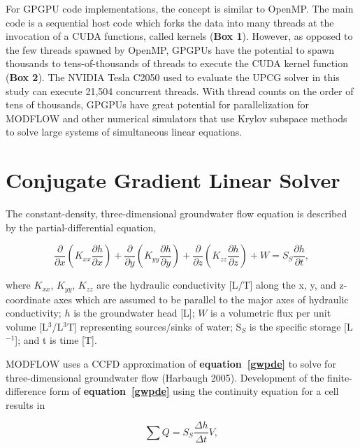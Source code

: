 \documentclass[12pt]{article}
\begin{document}
For GPGPU code implementations, the concept is similar to OpenMP.  The main code is a sequential host code which forks the data into many threads at the invocation of a CUDA \color{blue}functions, called kernels (\textbf{Box 1})\color{black}.  \color{blue}However, as opposed to the few threads spawned by OpenMP, GPGPUs have the potential to spawn thousands to tens-of-thousands of threads to execute the CUDA kernel function (\textbf{Box 2}). The NVIDIA Tesla C2050 used to evaluate the UPCG solver in this study can execute 21,504 concurrent threads. \color{black} With thread counts on the order of tens of thousands, GPGPUs have great potential for parallelization \color{blue} for MODFLOW and other numerical simulators that use Krylov subspace methods to solve large systems of simultaneous linear equations\color{black}.


\section* {\bf Conjugate Gradient Linear Solver}
The constant-density, three-dimensional groundwater flow equation is described by the partial-differential equation,

\begin{equation}
	\label{gwpde}
	\frac{\partial}{\partial x} \left( K_{xx} \frac{\partial h}{\partial x} \right) + 
	\frac{\partial}{\partial y} \left( K_{yy} \frac{\partial h}{\partial y} \right) + 
	\frac{\partial}{\partial z} \left( K_{zz} \frac{\partial h}{\partial z} \right) + 
	W = S_{S} \frac{\partial h}{\partial t} ,
\end{equation}

\noindent
where  $K_{xx}$, $K_{yy}$, $K_{zz}$ are the hydraulic conductivity [L/T] along the x, y, and z-coordinate axes which are assumed to be parallel to the major axes of hydraulic conductivity; $h$ is the groundwater head [L]; $W$ is a volumetric flux per unit volume [L$^{3}$/L$^{3}$T] representing sources/sinks of water; S$_{S}$ is the specific storage [L$^{-1}$]; and t is time [T].

MODFLOW uses a CCFD approximation of \textbf{equation~\ref{gwpde}} to solve for three-dimensional groundwater flow (Harbaugh 2005). Development of the finite-difference form of \textbf{equation~\ref{gwpde}} using the continuity equation for a cell results in

\begin{equation}
	\label{conteq}
	\sum Q = S_{S} \frac{\Delta h}{\Delta t} V,
\end{equation}
\end{document}
